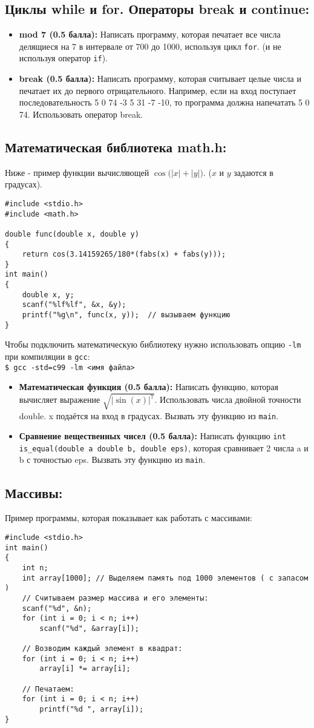 \documentclass{article}
\begin{document}
\subsection*{Циклы while и for. Операторы break и continue:}
\begin{itemize}
\item \textbf{mod 7 (0.5 балла):} Написать программу, которая печатает все числа делящиеся на 7 в интервале от 700 до 1000, используя цикл \texttt{for}. (и не используя оператор \texttt{if}).
\item \textbf{break (0.5 балла):} Написать программу, которая считывает целые числа и печатает их до первого отрицательного. Например, если на вход поступает последовательность 5 0 74 -3 5 31 -7 -10, то программа должна напечатать 5 0 74. Использовать оператор break.
\end{itemize}

\subsection*{Математическая библиотека math.h:}
Ниже - пример функции вычисляющей $\cos \big(|x| + |y|\big)$. ($x$ и $y$ задаются в градусах).
\begin{lstlisting}
#include <stdio.h>
#include <math.h>

double func(double x, double y)
{
	return cos(3.14159265/180*(fabs(x) + fabs(y)));
}
int main()
{
	double x, y;
	scanf("%lf%lf", &x, &y);
	printf("%g\n", func(x, y));  // вызываем функцию
}
\end{lstlisting}
Чтобы подключить математическую библиотеку нужно использовать опцию \texttt{-lm} при компиляции в \texttt{gcc}:\\
\texttt{\$ gcc -std=c99 -lm <имя файла>}
\begin{itemize}
\item \textbf{Математическая функция (0.5 балла):} Написать функцию, которая вычисляет выражение $\sqrt{|\sin(x)|^7}$. Использовать числа двойной точности double. x подаётся на вход в градусах. Вызвать эту функцию из \texttt{main}.
\item \textbf{Сравнение вещественных чисел (0.5 балла):} Написать функцию \texttt{int is\_equal(double a double b, double eps)}, которая сравнивает 2 числа a и b с точностью eps. Вызвать эту функцию из \texttt{main}.
\end{itemize}
\subsection*{Массивы:}
Пример программы, которая показывает как работать с массивами:
\begin{lstlisting}
#include <stdio.h>
int main()
{
	int n;
	int array[1000]; // Выделяем память под 1000 элементов ( с запасом )
	// Считываем размер массива и его элементы:
	scanf("%d", &n);
	for (int i = 0; i < n; i++)
		scanf("%d", &array[i]);
	
	// Возводим каждый элемент в квадрат:
	for (int i = 0; i < n; i++)
		array[i] *= array[i];
	
	// Печатаем:
	for (int i = 0; i < n; i++)
		printf("%d ", array[i]);
}
\end{lstlisting}
\end{document}
